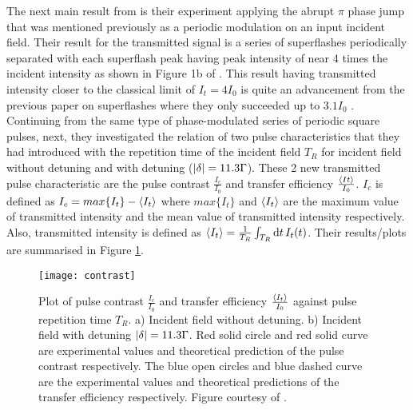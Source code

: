 The next main result from \cite{Kwong2015} is their experiment applying the abrupt $\pi$ phase jump that was mentioned previously as a periodic modulation on an input incident field. Their result for the transmitted signal is a series of superflashes periodically separated with each superflash peak having peak intensity of near 4 times the incident intensity as shown in Figure 1b of \cite{Kwong2015}. This result having transmitted intensity closer to the classical limit of $I_{t} = 4 I_{0}$ is quite an advancement from the previous paper on superflashes where they only succeeded up to $3.1 I_{0}$ \cite{Kwong2014}.\\

Continuing from the same type of phase-modulated series of periodic square pulses, next, they investigated the relation of two pulse characteristics that they had introduced with the repetition time of the incident field $T_{R}$ for incident field without detuning and with detuning ($\abs{\delta} = 11.3 \Gamma$). These 2 new transmitted pulse characteristic are the pulse contrast $\frac{I_{c}}{I_{0}}$ and transfer efficiency $\frac{\expval{I_{}t}}{I_{0}}$. $I_{c}$ is defined as $I_{c} = max\{I_{t}\} - \expval{I_{t}}$ where $max\{I_{t}\}$ and $\expval{I_{t}}$ are the maximum value of transmitted intensity and the mean value of transmitted intensity respectively. Also, transmitted intensity is defined as $\expval{I_{t}} = \frac{1}{T_{R}} \int_{T_{R}} \dd{t} I_{t}(t)$. Their results/plots are summarised in Figure \ref{fig: contrast}.

\begin{figure}[h!]
    \centering
    \texttt{[image: contrast]}
    \caption{Plot of pulse contrast $\frac{I_{c}}{I_{0}}$ and transfer efficiency $\frac{\expval{I_{t}}}{I_{0}}$ against pulse repetition time $T_{R}$. a) Incident field without detuning. b) Incident field with detuning $\abs{\delta} = 11.3 \Gamma$. Red solid circle and red solid curve are experimental values and theoretical prediction of the pulse contrast respectively. The blue open circles and blue dashed curve are the experimental values and theoretical predictions of the transfer efficiency respectively. Figure courtesy of \cite{Kwong2015}.}
    \label{fig: contrast}
\end{figure}

\newpage

